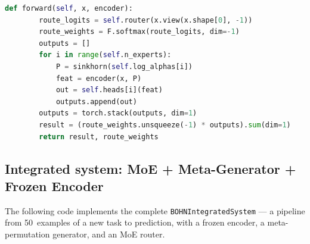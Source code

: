 \documentclass[11pt,a4paper]{report}
\begin{document}
\begin{lstlisting}[language=Python]
    def forward(self, x, encoder):
        route_logits = self.router(x.view(x.shape[0], -1))
        route_weights = F.softmax(route_logits, dim=-1)
        outputs = []
        for i in range(self.n_experts):
            P = sinkhorn(self.log_alphas[i])
            feat = encoder(x, P)
            out = self.heads[i](feat)
            outputs.append(out)
        outputs = torch.stack(outputs, dim=1)
        result = (route_weights.unsqueeze(-1) * outputs).sum(dim=1)
        return result, route_weights
\end{lstlisting}

\subsection{Integrated system: MoE + Meta-Generator + Frozen Encoder}
\label{app:integrated_system}

The following code implements the complete \texttt{BOHNIntegratedSystem} ---
a pipeline from 50~examples of a new task to prediction, with a frozen encoder,
a meta-permutation generator, and an MoE router.
\end{document}

